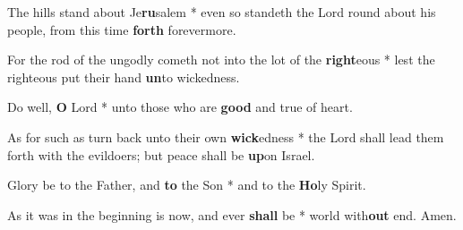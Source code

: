 \begin{multicols}{2}
	The hills stand about Je\textbf{ru}salem * even so standeth the Lord round about his people, from this time \textbf{forth} forevermore.
	
	For the rod of the ungodly cometh not into the lot of the \textbf{right}eous * lest the righteous put their hand \textbf{un}to wickedness.
	
	Do well, \textbf{O} Lord * unto those who are \textbf{good} and true of heart.
	
	As for such as turn back unto their own \textbf{wick}edness * the Lord shall lead them forth with the evildoers; but peace shall be \textbf{up}on Israel.
	
	Glory be to the Father, and \textbf{to} the Son * and to the \textbf{Ho}ly Spirit.
	
	As it was in the beginning is now, and ever \textbf{shall} be * world with\textbf{out} end. Amen.
\end{multicols}